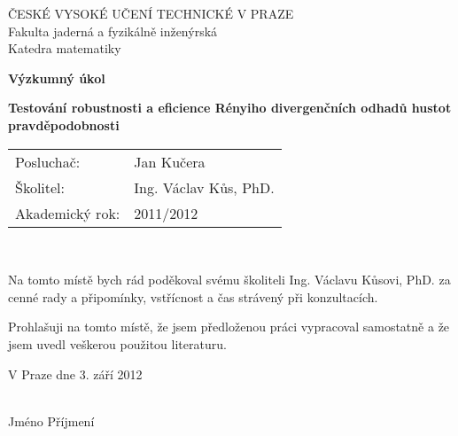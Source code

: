 \begin{center}

{\Large ČESKÉ VYSOKÉ UČENÍ TECHNICKÉ V PRAZE} \\[3mm]
{\Large Fakulta jaderná a fyzikálně inženýrská} \\[3mm]
{\Large Katedra matematiky}


{\Large\bf Výzkumný úkol}


{\LARGE\bf Testování robustnosti a eficience Rényiho divergenčních odhadů hustot pravděpodobnosti }

\vspace{1cm}


\end{center}

\begin{tabular}{ll} 
{\Large Posluchač:} & {\Large Jan Kučera} \\[1mm]
{\Large \v{S}kolitel:} & {\Large Ing. Václav Kůs, PhD.} \\[2mm]
{\Large Akademický rok:}     & {\Large 2011/2012}
\end{tabular}

\newpage 


\thispagestyle{empty}
\normalsize %
\ \vspace{10mm}

\noindent Na tomto místě bych rád poděkoval svému školiteli Ing. Václavu Kůsovi, PhD. za cenné rady a připomínky, vstřícnost a čas strávený při konzultacích. %


\vspace{0.5cm}

Prohlašuji na tomto místě, že jsem předloženou práci
vypracoval samostatně a že jsem uvedl veškerou použitou
literaturu.

\vspace{1.5cm}

\noindent
\begin{minipage}[b]{5cm}
V Praze dne 3. září 2012
\end{minipage}
\hfill
\begin{minipage}[t]{5cm}
\begin{center}
\dotfill\\
Jméno Příjmení
\end{center}
\end{minipage}

\vspace*{2cm}  

\newpage